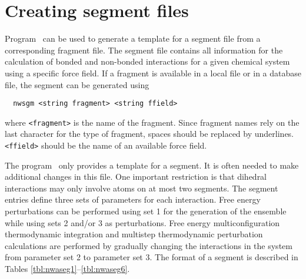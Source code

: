 \section{Creating segment files}
\label{sec:nwanwsgm}
Program \nwsgm\ can be used to generate a template for a segment file 
from a corresponding fragment file. The segment file contains all
information for the calculation of bonded and non-bonded interactions
for a given chemical system using a specific force field. If a
fragment is available in a local file or in a database file, the
segment can be generated using
\begin{verbatim}
  nwsgm <string fragment> <string ffield>
\end{verbatim}
where \verb+<fragment>+ is the name of the fragment. Since fragment
names rely on the last character for the type of fragment, spaces
should be replaced by underlines. \verb+<ffield>+ should be the
name of an available force field.

The program \nwsgm\ only provides a template for a segment. It is
often needed to make additional changes in this file. One important
restriction is that dihedral interactions may only involve atoms on at
most two segments. The segment entries define three sets of parameters
for each interaction. Free energy perturbations can be performed using
set 1 for the generation of the ensemble while using sets 2 and/or 3
as perturbations. Free energy multiconfiguration thermodynamic
integration and multistep thermodynamic perturbation calculations are
performed by gradually changing the interactions in the system from
parameter set 2 to parameter set 3.  The format of a segment is
described in Tables \ref{tbl:nwaseg1}--\ref{tbl:nwaseg6}.

